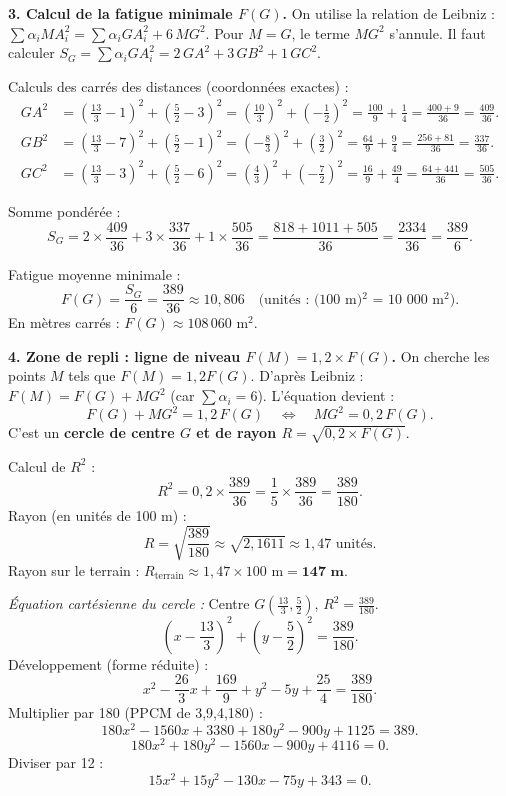 \documentclass[11pt]{article}
\begin{document}
\begin{exoresolu}
\textbf{3. Calcul de la fatigue minimale $F(G)$.}
On utilise la relation de Leibniz : $\sum \alpha_i MA_i^2 = \sum \alpha_i GA_i^2 + 6\,MG^2$.
Pour $M=G$, le terme $MG^2$ s'annule. Il faut calculer $S_G = \sum \alpha_i GA_i^2 = 2\,GA^2 + 3\,GB^2 + 1\,GC^2$.

Calculs des carrés des distances (coordonnées exactes) :
\begin{align*}
GA^2 &= \left(\frac{13}{3}-1\right)^2 + \left(\frac{5}{2}-3\right)^2 = \left(\frac{10}{3}\right)^2 + \left(-\frac{1}{2}\right)^2 = \frac{100}{9} + \frac{1}{4} = \frac{400+9}{36} = \frac{409}{36}. \\[4pt]
GB^2 &= \left(\frac{13}{3}-7\right)^2 + \left(\frac{5}{2}-1\right)^2 = \left(-\frac{8}{3}\right)^2 + \left(\frac{3}{2}\right)^2 = \frac{64}{9} + \frac{9}{4} = \frac{256+81}{36} = \frac{337}{36}. \\[4pt]
GC^2 &= \left(\frac{13}{3}-3\right)^2 + \left(\frac{5}{2}-6\right)^2 = \left(\frac{4}{3}\right)^2 + \left(-\frac{7}{2}\right)^2 = \frac{16}{9} + \frac{49}{4} = \frac{64+441}{36} = \frac{505}{36}.
\end{align*}

Somme pondérée :
\[
S_G = 2\times\frac{409}{36} + 3\times\frac{337}{36} + 1\times\frac{505}{36}
= \frac{818 + 1011 + 505}{36}
= \frac{2334}{36}
= \frac{389}{6}.
\]

Fatigue moyenne minimale :
\[
F(G) = \frac{S_G}{6} = \frac{389}{36} \approx 10,806 \quad\text{(unités : (100 m)$^2$ = 10 000 m$^2$)}.
\]
En mètres carrés : $F(G) \approx 108\,060 \text{ m}^2$.

\textbf{4. Zone de repli : ligne de niveau $F(M) = 1,2 \times F(G)$.}
On cherche les points $M$ tels que $F(M) = 1,2 F(G)$.
D'après Leibniz : $F(M) = F(G) + MG^2$ (car $\sum\alpha_i = 6$).
L'équation devient :
\[
F(G) + MG^2 = 1,2\,F(G) \quad\Longleftrightarrow\quad MG^2 = 0,2\,F(G).
\]
C'est un \textbf{cercle de centre $G$ et de rayon $R = \sqrt{0,2 \times F(G)}$}.

Calcul de $R^2$ :
\[
R^2 = 0,2 \times \frac{389}{36} = \frac{1}{5} \times \frac{389}{36} = \frac{389}{180}.
\]
Rayon (en unités de 100 m) :
\[
R = \sqrt{\frac{389}{180}} \approx \sqrt{2,1611} \approx 1,47 \text{ unités}.
\]
Rayon sur le terrain : $R_{\text{terrain}} \approx 1,47 \times 100 \text{ m} = \textbf{147 m}$.

\emph{Équation cartésienne du cercle :}
Centre $G\left(\frac{13}{3},\frac{5}{2}\right)$, $R^2 = \frac{389}{180}$.
\[
\left(x - \frac{13}{3}\right)^2 + \left(y - \frac{5}{2}\right)^2 = \frac{389}{180}.
\]
Développement (forme réduite) :
\[
x^2 - \frac{26}{3}x + \frac{169}{9} + y^2 - 5y + \frac{25}{4} = \frac{389}{180}.
\]
Multiplier par 180 (PPCM de 3,9,4,180) :
\[
180x^2 - 1560x + 3380 + 180y^2 - 900y + 1125 = 389.
\]
\[
180x^2 + 180y^2 - 1560x - 900y + 4116 = 0.
\]
Diviser par 12 :
\[
\boxed{15x^2 + 15y^2 - 130x - 75y + 343 = 0}.
\]


\end{exoresolu}
\end{document}
